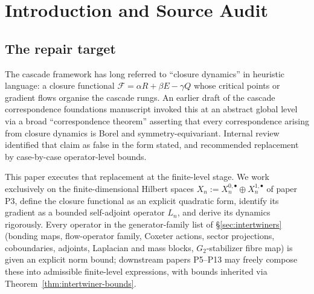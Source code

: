 \documentclass[11pt, a4paper]{amsart}
\theoremstyle{definition}
\begin{document}
\begin{abstract}
An earlier foundations draft contained a broad ``all correspondences
are Borel / equivariant'' framing as a global theorem-grade claim;
this paper deliberately does not rely on that, and instead supplies
an explicit generator-family list of \emph{admissible finite-level
operator expressions} (Definition~\ref{def:admissible}; the legacy
name ``intertwiner'' is retained for continuity but is purely
syntactic, not equivariance-implying), with printed operator-norm
bounds and continuity/Borel measurability following directly from
finite-dimensional functional calculus
(Theorem~\ref{thm:intertwiner-bounds}). This is the fourth of
thirteen planned cascade infrastructure papers.

\emph{No continuum-limit, Gromov--Hausdorff, or
manifold-identification claim is made here. No target-side
metric, hydrodynamic, gauge, spectral, Hecke, cohomology, or CTM
correspondence theorem is in scope; those are P5--P13.}
\end{abstract}

\tableofcontents

\section{Introduction and Source Audit}
\label{sec:intro}

\subsection{The repair target}

The cascade framework has long referred to ``closure dynamics'' in
heuristic language: a closure functional $\mathcal{F} = \alpha R +
\beta E - \gamma Q$ whose critical points or gradient flows
organise the cascade rungs. An earlier draft of the cascade
correspondence foundations manuscript invoked this at an abstract
global level via a broad ``correspondence theorem'' asserting that
every correspondence arising from closure dynamics is Borel and
symmetry-equivariant. Internal review identified that claim as
false in the form stated, and recommended replacement by
case-by-case operator-level bounds.

This paper executes that replacement at the finite-level stage.
We work exclusively on the finite-dimensional Hilbert spaces
$X_n := X_n^{0, \bullet} \oplus X_n^{1, \bullet}$ of paper P3,
define the closure functional as an explicit quadratic form,
identify its gradient as a bounded self-adjoint operator $L_n$,
and derive its dynamics rigorously. Every operator in the
generator-family list of \S\ref{sec:intertwiners} (bonding maps,
flow-operator family, Coxeter actions, sector projections,
coboundaries, adjoints, Laplacian and mass blocks, $G_2$-stabilizer
fibre map) is given an explicit norm bound; downstream papers
P5--P13 may freely compose these into admissible finite-level
expressions, with bounds inherited via
Theorem~\ref{thm:intertwiner-bounds}.
\end{document}
